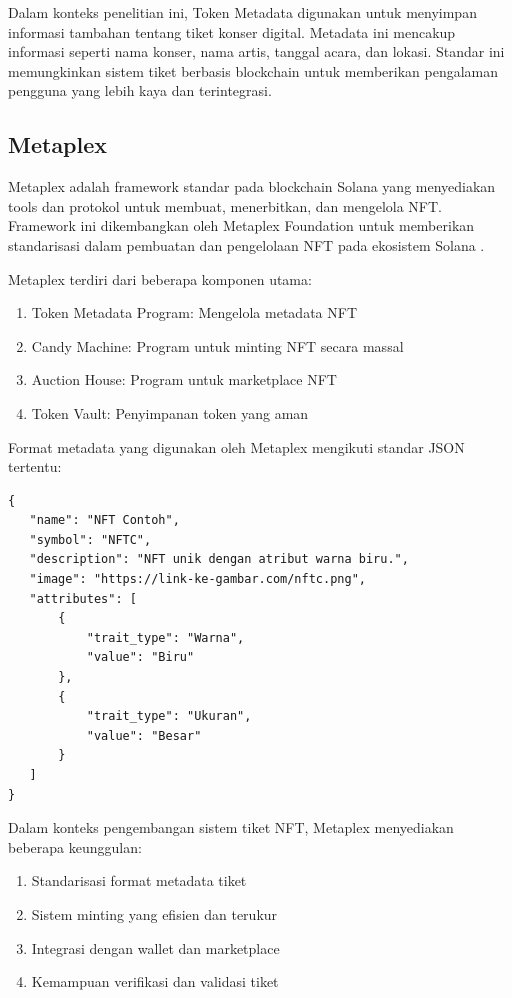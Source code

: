 Dalam konteks penelitian ini, Token Metadata digunakan untuk menyimpan informasi tambahan tentang tiket konser digital. Metadata ini mencakup informasi seperti nama konser, nama artis, tanggal acara, dan lokasi. Standar ini memungkinkan sistem tiket berbasis blockchain untuk memberikan pengalaman pengguna yang lebih kaya dan terintegrasi.

\subsection{Metaplex}
Metaplex adalah framework standar pada blockchain Solana yang menyediakan tools dan protokol untuk membuat, menerbitkan, dan mengelola NFT. Framework ini dikembangkan oleh Metaplex Foundation untuk memberikan standarisasi dalam pembuatan dan pengelolaan NFT pada ekosistem Solana \parencite{ref10}.

Metaplex terdiri dari beberapa komponen utama:
\begin{enumerate}[noitemsep,topsep=0pt]  %
    \item Token Metadata Program: Mengelola metadata NFT
    \item Candy Machine: Program untuk minting NFT secara massal
    \item Auction House: Program untuk marketplace NFT
    \item Token Vault: Penyimpanan token yang aman
\end{enumerate}

Format metadata yang digunakan oleh Metaplex mengikuti standar JSON tertentu:

\begin{verbatim}
{
   "name": "NFT Contoh",
   "symbol": "NFTC",
   "description": "NFT unik dengan atribut warna biru.",
   "image": "https://link-ke-gambar.com/nftc.png",
   "attributes": [
       {
           "trait_type": "Warna",
           "value": "Biru"
       },
       {
           "trait_type": "Ukuran",
           "value": "Besar"
       }
   ]
}
\end{verbatim}


Dalam konteks pengembangan sistem tiket NFT, Metaplex menyediakan beberapa keunggulan:
\begin{enumerate}
   \item Standarisasi format metadata tiket
   \item Sistem minting yang efisien dan terukur
   \item Integrasi dengan wallet dan marketplace
   \item Kemampuan verifikasi dan validasi tiket
\end{enumerate}


